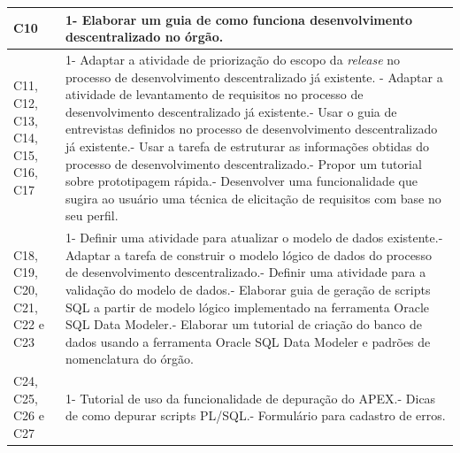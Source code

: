 \begin{longtable}{|M{2.0cm}|m{13.0cm}|}
C10                                               & 1- Elaborar um guia de como funciona desenvolvimento descentralizado no órgão.                                                                                                                                                                                                                                                                                                                                                                                                                                                                          \\ \hline
C11, C12, C13, C14, C15, C16, C17                 & 1- Adaptar a atividade de priorização do escopo da \textit{release} no processo de desenvolvimento descentralizado já existente. - Adaptar a atividade de levantamento de requisitos no processo de desenvolvimento descentralizado já existente.- Usar o guia de entrevistas definidos no processo de desenvolvimento descentralizado já existente.- Usar a tarefa de estruturar as informações obtidas do processo de desenvolvimento descentralizado.- Propor um tutorial sobre prototipagem rápida.- Desenvolver uma funcionalidade que sugira ao usuário uma técnica de elicitação de requisitos com base no seu perfil.    \\ \hline
C18, C19, C20, C21, C22 e C23                  & 1- Definir uma atividade para atualizar o modelo de dados existente.- Adaptar a tarefa de construir o modelo lógico de dados do processo de desenvolvimento descentralizado.- Definir uma atividade para a validação do modelo de dados.- Elaborar guia de geração de scripts SQL a partir de modelo lógico implementado na ferramenta Oracle SQL Data Modeler.- Elaborar um tutorial de criação do banco de dados usando a ferramenta Oracle SQL Data Modeler e padrões de nomenclatura do órgão. \\ \hline
C24, C25, C26 e C27                              & 1- Tutorial de uso da funcionalidade de depuração do APEX.- Dicas de como depurar scripts PL/SQL.- Formulário para cadastro de erros.                                                                                                                                                                                                                                                                                                                                                                      \\ \hline

\end{longtable}
